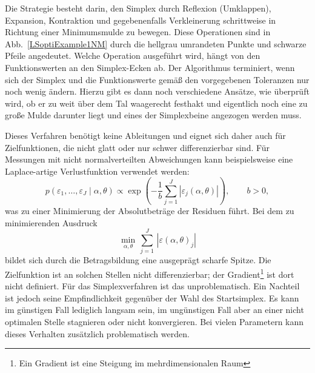 Die Strategie besteht darin, den Simplex durch Reflexion (Umklappen), Expansion, Kontraktion und
gegebenenfalls Verkleinerung schrittweise in Richtung einer Minimumsmulde zu bewegen.
Diese Operationen sind in Abb.~\ref{LSoptiExample1NM} durch die hellgrau umrandeten
Punkte und schwarze Pfeile angedeutet. Welche Operation ausgeführt wird, hängt von den
Funktionswerten an den Simplex-Ecken ab. Der Algorithmus terminiert, wenn sich der
Simplex und die Funktionswerte gemäß den vorgegebenen Toleranzen nur noch wenig ändern. Hierzu gibt es dann
noch verschiedene Ansätze, wie überprüft wird, ob er zu weit über dem Tal waagerecht festhakt und
eigentlich noch eine zu große Mulde darunter liegt und eines der Simplexbeine angezogen werden muss.

Dieses Verfahren benötigt keine Ableitungen und eignet sich daher auch für Zielfunktionen,
die nicht glatt oder nur schwer differenzierbar sind. Für Messungen mit nicht
normalverteilten Abweichungen kann beispielsweise eine Laplace-artige Verlustfunktion
verwendet werden:
\begin{equation}
p(\varepsilon_1,\dots,\varepsilon_J \mid \alpha, \theta)
\propto \exp\!\left(-\frac{1}{b}\sum\limits_{j=1}^J
|\varepsilon_j(\alpha,\theta)|\right),\qquad b>0,
\end{equation}
was zu einer Minimierung der Absolutbeträge der Residuen führt. Bei dem zu minimierenden
Ausdruck
\begin{equation}
\min_{\alpha,\theta} \, \sum\limits_{j=1}^J \, | \varepsilon(\alpha,\theta)_j |
\end{equation}
bildet sich durch die Betragsbildung eine ausgeprägt scharfe Spitze. Die Zielfunktion ist
an solchen Stellen nicht differenzierbar; der Gradient\footnote{Ein Gradient ist eine Steigung im mehrdimensionalen Raum} ist dort nicht definiert. Für das
Simplexverfahren ist das unproblematisch. Ein Nachteil ist jedoch seine Empfindlichkeit
gegenüber der Wahl des Startsimplex. Es kann im günstigen Fall lediglich langsam sein,
im ungünstigen Fall aber an einer nicht optimalen Stelle stagnieren oder nicht
konvergieren. Bei vielen Parametern kann dieses Verhalten zusätzlich problematisch werden.

